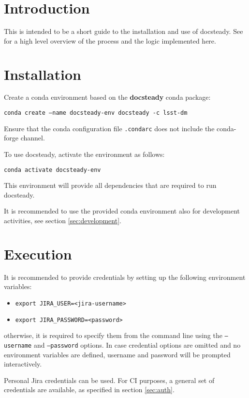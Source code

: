 
\section{Introduction}

This is intended to be a short guide to the installation and use of docsteady.
See \cite{DMTN-140} for a high level overview of the process and the logic implemented here.


\section{Installation}\label{sec:install}

Create a conda environment based on the \textbf{docsteady} conda package:

\texttt{conda create --name docsteady-env docsteady -c lsst-dm}

Ensure that the conda configuration file  \texttt{.condarc} does not include the conda-forge channel.

To use docsteady, activate the environment as follows:

\texttt{conda activate docsteady-env}

This environment will provide all dependencies that are required to run docsteady.

It is recommended to use the provided conda environment also for development activities, see section \ref{sec:development}.


\section{Execution}

It is recommended to provide credentials by setting up the following environment variables:

\begin{itemize}
\item \texttt{export JIRA\_USER=<jira-username>}
\item \texttt{export JIRA\_PASSWORD=<password>}
\end{itemize}

otherwise, it is required to specify them from the command line using the \texttt{--username} and \texttt{--password} options.
In case credential options are omitted and no environment variables are defined, username and password will be prompted interactively.

Personal Jira credentials can be used. 
For CI purposes, a general set of credentials are available, as specified in section \ref{sec:auth}.


